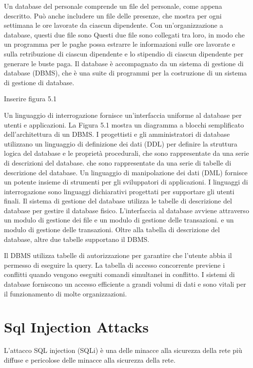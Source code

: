 \singlespacing

Un database del personale comprende un file del personale, come appena descritto. Può anche includere un file delle presenze, che mostra per ogni settimana le ore lavorate da ciascun dipendente. Con un'organizzazione a database, questi due file sono Questi due file sono collegati tra loro, in modo che un programma per le paghe possa estrarre le informazioni sulle ore lavorate e sulla retribuzione di ciascun dipendente e lo stipendio di ciascun dipendente per generare le buste paga. Il database è accompagnato da un sistema di gestione di database (DBMS), che è una suite di programmi per la costruzione di un sistema di gestione di database.

\singlespacing

Inserire figura 5.1

Un linguaggio di interrogazione fornisce un'interfaccia uniforme al database per utenti e applicazioni.
La Figura 5.1 mostra un diagramma a blocchi semplificato dell'architettura di un DBMS. I progettisti e gli amministratori di database utilizzano un linguaggio di definizione dei dati (DDL) per definire la struttura logica del database e le proprietà procedurali, che sono rappresentate da una serie di descrizioni del database.
che sono rappresentate da una serie di tabelle di descrizione del database. Un linguaggio di manipolazione dei dati (DML) fornisce un potente insieme di strumenti per gli sviluppatori di applicazioni. I linguaggi di interrogazione sono
linguaggi dichiarativi progettati per supportare gli utenti finali. Il sistema di gestione del database utilizza le tabelle di descrizione del database per gestire il database fisico.
L'interfaccia al database avviene attraverso un modulo di gestione dei file e un modulo di gestione delle transazioni.
e un modulo di gestione delle transazioni. Oltre alla tabella di descrizione del database, altre due tabelle supportano il DBMS.

\singlespacing

Il DBMS utilizza tabelle di autorizzazione per garantire che l'utente abbia il permesso di eseguire la query. La tabella di accesso concorrente previene i conflitti quando vengono eseguiti comandi simultanei in conflitto. I sistemi di database forniscono un accesso efficiente a grandi volumi di dati e sono vitali per il funzionamento di molte organizzazioni. 
\section{Sql Injection Attacks}
L'attacco SQL injection (SQLi) è una delle minacce alla sicurezza della rete più diffuse e pericolose delle minacce alla sicurezza della rete. 

